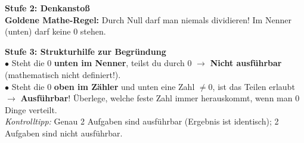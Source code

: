 \documentclass[a4paper, 10pt]{article}
\begin{document}
\begin{tcolorbox}[colback=step2Bg, colframe=step2Border, arc=1.8mm, boxrule=0.7pt, left=3mm, right=3mm, top=1.8mm, bottom=1.8mm]
    {\color{step2Text}\small\bfseries\faLightbulb\enskip Stufe 2: Denkanstoß}\\[1mm]
    {\footnotesize \textbf{Goldene Mathe-Regel:} Durch Null darf man niemals dividieren! Im Nenner (unten) darf keine $0$ stehen.}
\end{tcolorbox}

\begin{tcolorbox}[colback=step3Bg, colframe=step3Border, arc=1.8mm, boxrule=0.7pt, left=3mm, right=3mm, top=1.8mm, bottom=1.8mm]
    {\color{step3Text}\small\bfseries\faCheckSquare\enskip Stufe 3: Strukturhilfe zur Begründung}\\[1mm]
    {\footnotesize
    $\bullet$ Steht die $0$ \textbf{unten im Nenner}, teilst du durch $0$ $\longrightarrow$ \textbf{Nicht ausführbar} (mathematisch nicht definiert!).\\[0.5mm]
    $\bullet$ Steht die $0$ \textbf{oben im Zähler} und unten eine Zahl $\neq 0$, ist das Teilen erlaubt $\longrightarrow$ \textbf{Ausführbar}! Überlege, welche feste Zahl immer herauskommt, wenn man $0$ Dinge verteilt.\\[0.5mm]
    \textit{Kontrolltipp:} Genau 2 Aufgaben sind ausführbar (Ergebnis ist identisch); 2 Aufgaben sind nicht ausführbar.
    }
\end{tcolorbox}
\end{document}
